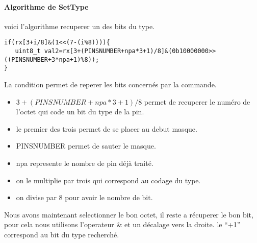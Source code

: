 \paragraph{Algorithme de SetType}
voici l'algorithme recuperer un des bits du type.



\begin{verbatim}
if(rx[3+i/8]&(1<<(7-(i%8)))){
   uint8_t val2=rx[3+(PINSNUMBER+npa*3+1)/8]&(0b10000000>>((PINSNUMBER+3*npa+1)%8));
}
\end{verbatim}

La condition permet de reperer les bits concernés par la commande.

\begin{itemize}
\item $3 + (PINSNUMBER + npa*3+1)/8$ permet de recuperer le numéro de l'octet qui code 
un bit du type de la pin.
\item le premier des trois permet de se placer au debut masque.
\item PINSNUMBER permet de sauter le masque.
\item npa represente le nombre de pin déjà traité.
\item on le multiplie par trois qui correspond au codage du type.
\item on divise par 8 pour avoir le nombre de bit.
\end{itemize}

Nous avons maintenant selectionner le bon octet, il reste a récuperer le bon bit, pour cela nous utilisons l'operateur \& et un décalage vers la droite.
le ``+1'' correspond au bit du type recherché.



